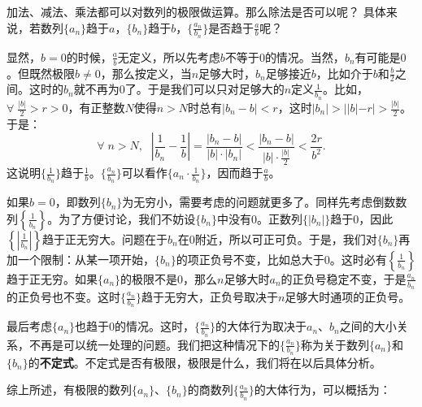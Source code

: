 \documentclass[12pt,UTF8,fontset=none]{ctexbook}
\begin{document}
加法、减法、乘法都可以对数列的极限做运算。那么除法是否可以呢？
具体来说，若数列$\{a_n\}$趋于$a$，$\{b_n\}$趋于$b$，$\{\frac{a_n}{b_n}\}$是否趋于$\frac{a}{b}$呢？

显然，$b=0$的时候，$\frac{a}{b}$无定义，所以先考虑$b$不等于$0$的情况。当然，$b_n$有可能是$0$。但既然极限$b\neq 0$，那么按定义，当$n$足够大时，$b_n$足够接近$b$，比如介于$b$和$\frac{b}{2}$之间。这时的$b_n$就不再为$0$了。于是我们可以只对足够大的$n$定义$\frac{1}{b_n}$。比如，$\forall \; \frac{|b|}{2}>r>0$，有正整数$N$使得$n>N$时总有$|b_n - b| < r$，这时$|b_n| > ||b| - r| > \frac{|b|}{2}$。于是：
$$ \forall\; n>N, \,\;\, \left| \frac{1}{b_n} - \frac{1}{b} \right| = \frac{|b_n - b|}{|b|\cdot|b_n|} < \frac{|b_n - b|}{|b|\cdot\frac{|b|}{2}} < \frac{2r}{b^2}.$$
这说明$\{\frac{1}{b_n}\}$趋于$\frac{1}{b}$。$\{\frac{a_n}{b_n}\}$可以看作$\{a_n \cdot \frac{1}{b_n}\}$，因而趋于$\frac{a}{b}$。

如果$b=0$，即数列$\{b_n\}$为无穷小，需要考虑的问题就更多了。同样先考虑倒数数列$\left\{\frac{1}{b_n}\right\}$。为了方便讨论，我们不妨设$\{b_n\}$中没有$0$。正数列$\{|b_n|\}$趋于$0$，因此$\left\{\left|\frac{1}{b_n}\right|\right\}$趋于正无穷大。问题在于$b_n$在$0$附近，所以可正可负。于是，我们对$\{b_n\}$再加一个限制：从某一项开始，$\{b_n\}$的项正负号不变，比如总大于$0$。这时必有$\left\{\frac{1}{b_n}\right\}$趋于正无穷。如果$\{a_n\}$的极限不是$0$，那么$n$足够大时$a_n$的正负号稳定不变，于是$\frac{a_n}{b_n}$的正负号也不变。这时$\{\frac{a_n}{b_n}\}$趋于无穷大，正负号取决于$n$足够大时通项的正负号。

最后考虑$\{a_n\}$也趋于$0$的情况。这时，$\{\frac{a_n}{b_n}\}$的大体行为取决于$a_n$、$b_n$之间的大小关系，不再是可以统一处理的问题。我们把这种情况下的$\{\frac{a_n}{b_n}\}$称为关于数列$\{a_n\}$和$\{b_n\}$的\textbf{不定式}。不定式是否有极限，极限是什么，我们将在以后具体分析。

综上所述，有极限的数列$\{a_n\}$、$\{b_n\}$的商数列$\{\frac{a_n}{b_n}\}$的大体行为，可以概括为：
\begin{center}
\end{center}
\end{document}

